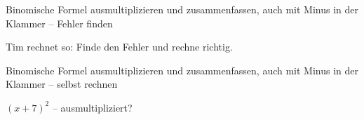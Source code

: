 \begin{aufgabe}{Binomische Formel ausmultiplizieren und zusammenfassen, auch mit Minus in der Klammer – Fehler finden}
\begin{teile}
\teil Tim rechnet so:  Finde den Fehler und rechne richtig. \leerfeld
\end{teile}
\end{aufgabe}

\begin{aufgabe}{Binomische Formel ausmultiplizieren und zusammenfassen, auch mit Minus in der Klammer – selbst rechnen}
\begin{teile}
\teil $(x + 7)^2$ – ausmultipliziert? \leerfeld
\end{teile}
\end{aufgabe}
